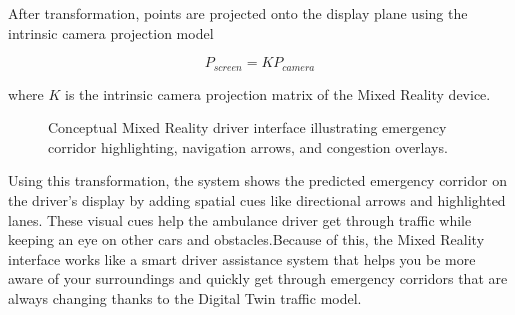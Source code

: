 \documentclass[conference]{IEEEtran}
\begin{document}
After transformation, points are projected onto the display plane using the intrinsic camera projection model

\begin{equation}
P_{screen} = K P_{camera}
\end{equation}

where $K$ is the intrinsic camera projection matrix of the Mixed Reality device.

\begin{figure}[t]
\centering
{}
\caption{Conceptual Mixed Reality driver interface illustrating emergency corridor highlighting, navigation arrows, and congestion overlays.}
\label{fig:mrui}
\end{figure}

Using this transformation, the system shows the predicted emergency corridor on the driver's display by adding spatial cues like directional arrows and highlighted lanes. These visual cues help the ambulance driver get through traffic while keeping an eye on other cars and obstacles.Because of this, the Mixed Reality interface works like a smart driver assistance system that helps you be more aware of your surroundings and quickly get through emergency corridors that are always changing thanks to the Digital Twin traffic model.
\end{document}
